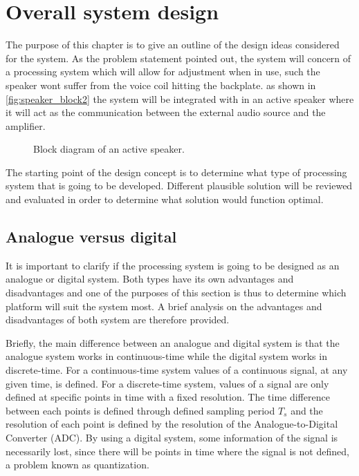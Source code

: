 \chapter{Overall system design}
The purpose of this chapter is to give an outline of the design ideas considered for the system. As the problem statement pointed out, the system will concern of a processing system which will allow for adjustment when in use, such the speaker wont suffer from the voice coil hitting the backplate. as shown in \autoref{fig:speaker_block2} the system will be integrated with in an active speaker where it will act as the communication between the external audio source and the amplifier.

\begin{figure}[H]
\centering
{}
\scalebox{0.9}{
}
\caption{Block diagram of an active speaker.}
\label{fig:speaker_block2}
\end{figure}

The starting point of the design concept is to determine what type of processing system that is going to be developed. Different plausible solution will be reviewed and evaluated in order to determine what solution would function optimal. 


\section{Analogue versus digital}

It is important to clarify if the processing system is going to be designed as an analogue or digital system. Both types have its own advantages and disadvantages and one of the purposes of this section is thus to determine which platform will suit the system most. A brief analysis on the advantages and disadvantages of both system are therefore provided. 

Briefly, the main difference between an analogue and digital system is that the analogue system works in continuous-time while the digital system works in discrete-time. For a continuous-time system values of a continuous signal, at any given time, is defined. For a discrete-time system, values of a signal are only defined at specific points in time with a fixed resolution. The time difference between each points is defined through defined sampling period $T_s$ and the resolution of each point is defined by the resolution of the Analogue-to-Digital Converter (ADC). By using a digital system, some information of the signal is necessarily lost, since there will be points in time where the signal is not defined, a problem known as quantization.

